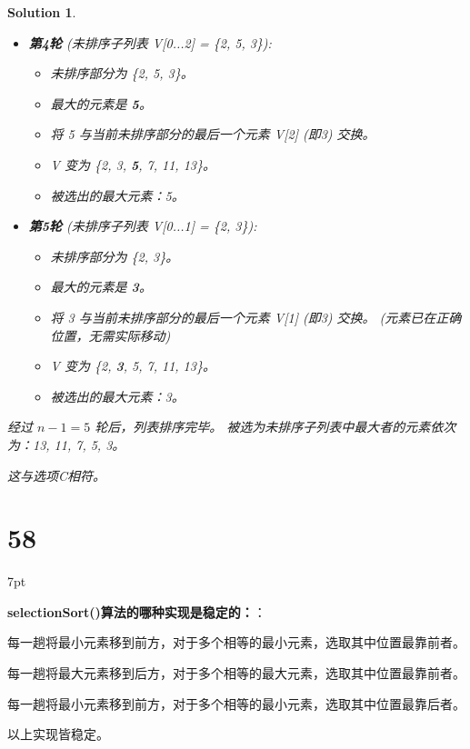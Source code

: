 \documentclass[UTF8]{report}
\newtheorem{solution}{Solution}
\theoremstyle{MyLineTheoremStyle} %
\theoremstyle{MyBlockTheoremStyle} %
\theoremstyle{MySubsubsectionStyle} %
\newenvironment{graybox}{%
        \def\FrameCommand{%
        \hspace{1pt}%
        {\color{gray}\small \vrule width 2pt}%
        {\color{graybox_color}\vrule width 4pt}%
        \colorbox{graybox_color}%
        }%
        \MakeFramed{\advance\hsize-\width\FrameRestore}%
        \noindent\hspace{-4.55pt}%
        \begin{adjustwidth}{}{7pt}%
        \vspace{2pt}\vspace{2pt}%
        }
        {%
        \vspace{2pt}\end{adjustwidth}\endMakeFramed%
        }
\begin{document}
\begin{solution}
\begin{itemize}
    \item \textbf{第4轮} (未排序子列表 V[0...2] = \{2, 5, 3\}):
    \begin{itemize}
        \item 未排序部分为 \{2, 5, 3\}。
        \item 最大的元素是 \textbf{5}。
        \item 将 5 与当前未排序部分的最后一个元素 V[2] (即3) 交换。
        \item V 变为 \{2, 3, \textbf{5}, 7, 11, 13\}。
        \item 被选出的最大元素：5。
    \end{itemize}

    \item \textbf{第5轮} (未排序子列表 V[0...1] = \{2, 3\}):
    \begin{itemize}
        \item 未排序部分为 \{2, 3\}。
        \item 最大的元素是 \textbf{3}。
        \item 将 3 与当前未排序部分的最后一个元素 V[1] (即3) 交换。 (元素已在正确位置，无需实际移动)
        \item V 变为 \{2, \textbf{3}, 5, 7, 11, 13\}。
        \item 被选出的最大元素：3。
    \end{itemize}
\end{itemize}
经过 $n-1 = 5$ 轮后，列表排序完毕。
被选为未排序子列表中最大者的元素依次为：13, 11, 7, 5, 3。

这与选项C相符。
\end{solution}


\section*{58}

\begin{graybox}
\textbf{selectionSort()算法的哪种实现是稳定的：}：
\begin{circledenum}
    \item 每一趟将最小元素移到前方，对于多个相等的最小元素，选取其中位置最靠前者。
    \item 每一趟将最大元素移到后方，对于多个相等的最大元素，选取其中位置最靠前者。
    \item 每一趟将最小元素移到前方，对于多个相等的最小元素，选取其中位置最靠后者。
    \item 以上实现皆稳定。
\end{circledenum}
\end{graybox}
\end{document}
